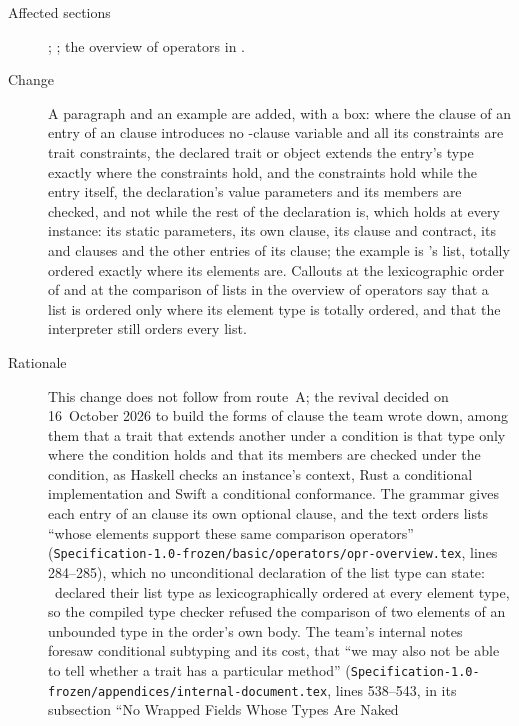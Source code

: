\begin{description}
\item[Affected sections] ; ;
the overview of operators in .
\item[Change] A paragraph and an example are added, with a box: where the
 clause of an entry of an  clause introduces no
-clause variable and all its constraints are trait constraints,
the declared trait or object extends the entry's type exactly where the
constraints hold, and the constraints hold while the entry itself, the
declaration's value parameters and its members are checked, and not
while the rest of the declaration is, which holds at every instance: its
static parameters, its own  clause, its  clause
and contract, its  and  clauses and the
other entries of its  clause;
the example is
\library's list, totally ordered exactly where its elements are.
Callouts at the lexicographic order of  and at
the comparison of lists in the overview of operators say that a list is
ordered only where its element type is totally ordered, and that the
interpreter still orders every list.
\item[Rationale] This change does not follow from route~A; the revival
decided on 16~October 2026 to build the forms of  clause the team
wrote down, among them that a trait that extends another under a
 condition is that type only where the condition holds and that
its members are checked under the condition, as Haskell checks an
instance's context, Rust a conditional implementation and Swift a
conditional conformance.
The grammar gives each entry of an  clause its own optional
 clause, and the text orders lists ``whose elements support these
same comparison operators''
(\nolinkurl{Specification-1.0-frozen/basic/operators/opr-overview.tex},
lines 284--285), which no
unconditional declaration of the list type can state:
\library\ declared their list type as lexicographically ordered at every
element type, so the compiled type checker refused the comparison of two
elements of an unbounded type in the order's own body.
The team's internal notes foresaw conditional subtyping and its cost,
that ``we may also not be able to tell whether a trait has a particular
method'' (\nolinkurl{Specification-1.0-frozen/appendices/internal-document.tex},
lines 538--543, in its subsection ``No Wrapped Fields Whose Types Are Naked

\end{description}
